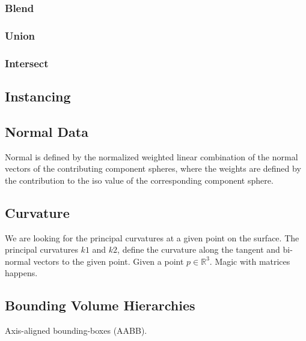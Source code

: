 \documentclass[conference]{acmsiggraph}
\begin{document}
\subsubsection{Blend}
\subsubsection{Union}
\subsubsection{Intersect}
\subsection{Instancing}
\subsection{Normal Data}
Normal is defined by the normalized weighted linear combination of the normal
vectors of the contributing component spheres, where the weights are defined by
the contribution to the iso value of the corresponding component
sphere\cite{Wyvill}.
\subsection{Curvature}
We are looking for the principal curvatures at a given point on the surface.
The principal curvatures $k1$ and $k2$, define the curvature along the tangent
and bi-normal vectors to the given point.
Given a point $p \in \mathbb{R}^3$. Magic with matrices
happens\cite{DeAraujo2004}.
\subsection{Bounding Volume Hierarchies}
Axis-aligned bounding-boxes (AABB).



\end{document}
